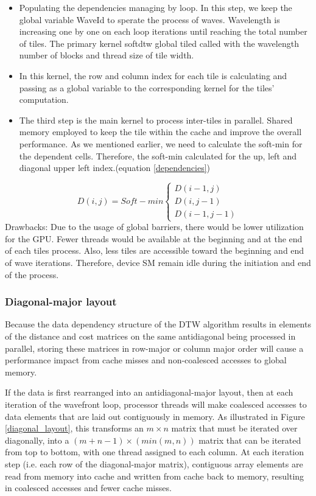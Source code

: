 \documentclass[12pt, letterpaper]{article}
\begin{document}
\begin{itemize}
  \item Populating the dependencies managing by loop. In this step, we keep the
    global variable WaveId to sperate the process of waves. Wavelength is
    increasing one by one on each loop iterations until reaching the total
    number of tiles. The primary kernel softdtw global tiled called with the
    wavelength number of blocks and thread size of tile width.
  \item In this kernel, the row and column index for each tile is calculating
    and passing as a global variable to the corresponding kernel for the tiles’
    computation.
  \item The third step is the main kernel to process inter-tiles in
    parallel. Shared memory employed to keep the tile within the cache and
    improve the overall performance. As we mentioned earlier, we need to
    calculate the soft-min for the dependent cells. Therefore, the soft-min
    calculated for the up, left and diagonal upper left index.(equation
    \ref{dependencies})
\end{itemize}

\begin{equation} \label{dependencies}
  D (i,j) = Soft-min
  \begin{cases}
        D(i-1,j) \\
        D(i,j-1)\\
        D(i-1,j-1)
  \end{cases}
\end{equation}
Drawbacks: Due to the usage of global barriers, there would be lower utilization
for the GPU.  Fewer threads would be available at the beginning and at the end
of each tiles process.  Also, less tiles are accessible toward the beginning and
end of wave iterations.  Therefore, device SM remain idle during the initiation
and end of the process.

\subsubsection{Diagonal-major layout}

Because the data dependency structure of the DTW algorithm results in elements
of the distance and cost matrices on the same antidiagonal being processed in
parallel, storing these matrices in row-major or column major order will cause a
performance impact from cache misses and non-coalesced accesses to global
memory.

If the data is first rearranged into an antidiagonal-major layout, then at each
iteration of the wavefront loop, processor threads will make coalesced accesses
to data elements that are laid out contiguously in memory. As illustrated in
Figure \ref{diagonal_layout}, this transforms an $m \times n$ matrix that must be
iterated over diagonally, into a $(m+n-1) \times (min(m,n))$ matrix that can be
iterated from top to bottom, with one thread assigned to each column. At each
iteration step (i.e. each row of the diagonal-major matrix), contiguous array
elements are read from memory into cache and written from cache back to memory,
resulting in coalesced accesses and fewer cache misses.
\end{document}
